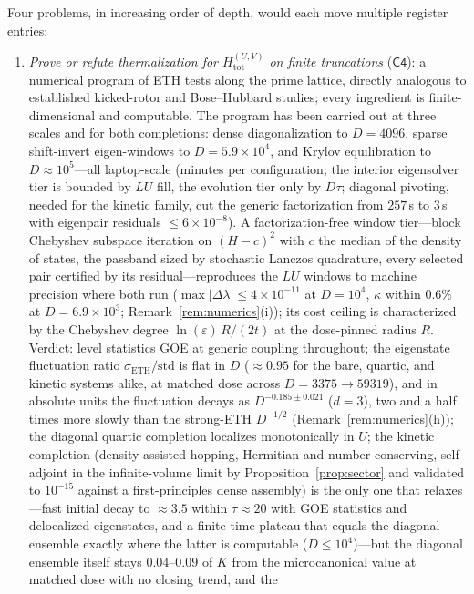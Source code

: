 Four problems, in increasing order of depth, would each move multiple register entries:
\begin{enumerate}[leftmargin=1.6em]
\item \emph{Prove or refute thermalization for $H_{\mathrm{tot}}^{(U,V)}$ on finite
truncations} ($\mathsf{C4}$): a numerical program of ETH tests along the prime
lattice, directly analogous to established kicked-rotor and Bose--Hubbard studies;
every ingredient is finite-dimensional and computable. The program has been carried out
at three scales and for both completions: dense diagonalization to $D=4096$, sparse
shift-invert eigen-windows to $D=5.9\times10^{4}$, and Krylov equilibration to
$D\approx10^{5}$---all laptop-scale (minutes per configuration; the interior
eigensolver tier is bounded by $LU$ fill, the evolution tier only by $D\tau$; diagonal
pivoting, needed for the kinetic family, cut the generic factorization from $257$\,s
to $3$\,s with eigenpair residuals $\leq6\times10^{-8}$). A factorization-free
window tier---block Chebyshev subspace iteration on $(H-c)^{2}$ with $c$ the median of
the density of states, the passband sized by stochastic Lanczos quadrature, every
selected pair certified by its residual---reproduces the $LU$ windows to machine
precision where both run ($\max|\Delta\lambda|\leq4\times10^{-11}$ at $D=10^{4}$,
$\kappa$ within $0.6\%$ at $D=6.9\times10^{3}$; Remark~\ref{rem:numerics}(i)); its
cost ceiling is characterized by the Chebyshev degree $\ln(\varepsilon)\,R/(2t)$ at the
dose-pinned radius $R$. Verdict: level
statistics GOE at generic coupling throughout; the eigenstate fluctuation ratio
$\sigma_{\mathrm{ETH}}/\mathrm{std}$ is flat in $D$ ($\approx0.95$ for the bare, quartic, and
kinetic systems alike, at matched dose across $D=3375\to59319$), and in absolute units the
fluctuation decays as $D^{-0.185\pm0.021}$ ($d=3$), two and a half times more slowly than
the strong-ETH $D^{-1/2}$ (Remark~\ref{rem:numerics}(h)); the diagonal quartic
completion localizes monotonically in
$U$; the kinetic completion (density-assisted hopping, Hermitian and number-conserving,
self-adjoint in the infinite-volume limit by Proposition~\ref{prop:sector} and validated
to $10^{-15}$ against a first-principles dense assembly) is the only one that
relaxes---fast initial decay to
$\approx3.5$ within $\tau\approx20$ with GOE statistics and delocalized eigenstates,
and a finite-time plateau that equals the diagonal ensemble exactly where the latter is
computable ($D\leq10^{4}$)---but the diagonal ensemble itself stays $0.04$--$0.09$ of
$K$ from the microcanonical value at matched dose with no closing trend, and the

\end{enumerate}
